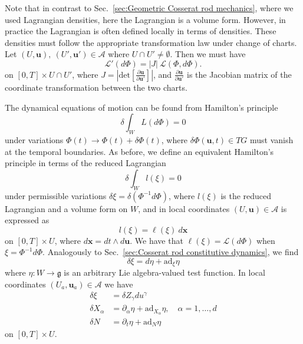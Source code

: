 Note that in contrast to Sec.~\ref{sec:Geometric Cosserat rod mechanics}, where we used Lagrangian densities, here the Lagrangian is a volume form. However, in practice the Lagrangian is often defined locally in terms of densities. These densities must follow the appropriate transformation law under change of charts. Let $(U, \mathbf{u}),\ (U', \mathbf{u}') \in \mathcal{A}$ where $U \cap U' \neq \emptyset$. Then we must have
\begin{equation} \label{eq:L transformation rule}
\mathcal{L}'(d \Phi) = |J|\ \mathcal{L}(\Phi, d \Phi).
\end{equation}
on $[0,T] \times U \cap U'$, where $J = \left| \text{det} \left[ \frac{\partial \mathbf{u} }{ \partial \mathbf{u}' } \right] \right|$, and $\frac{\partial \mathbf{u}}{ \partial \mathbf{u}' }$ is the Jacobian matrix of the coordinate transformation between the two charts.

The dynamical equations of motion can be found from Hamilton's principle
\begin{equation} \label{eq:Hamiltons principle in d dimensions}
\delta \int_W L(d \Phi) = 0
\end{equation}
under variations $\Phi(t) \to \Phi(t) + \delta \Phi (t)$, where $\delta \Phi (\mathbf{u}, t) \in TG$ must vanish at the temporal boundaries. As before, we define an equivalent Hamilton's principle in terms of the reduced Lagrangian
\begin{equation} \label{eq:reduced Hamiltons principle in d dimensions}
\delta \int_W l(\xi) = 0
\end{equation}
under permissible variations $\delta \xi = \delta(\Phi^{-1} d \Phi )$, where $l(\xi)$ is the reduced Lagrangian and a volume form on $W$, and in local coordinates $(U, \mathbf{u}) \in \mathcal{A}$ is expressed as
\begin{equation}
l(\xi) = \ell(\xi)\ d\mathbf{x}
\end{equation}
on $[0, T] \times U$, where $d \mathbf{x} = dt \wedge d \mathbf{u}$. We have that $\ell(\xi) = \mathcal{L}(d \Phi)$ when $\xi = \Phi^{-1} d \Phi$. Analogously to Sec.~\ref{sec:Cosserat rod constitutive dynamics}, we find
\begin{equation}
\delta \xi = d \eta + \text{ad}_\xi \eta
\end{equation}
where $\eta : W \to \mathfrak{g}$ is an arbitrary Lie algebra-valued test function. In local coordinates $(U_a, \mathbf{u}_a) \in \mathcal{A}$ we have
\begin{subequations} \label{eq:variation of xi}
\begin{align}
\delta \xi & =  \delta Z_\gamma du^\gamma  \\ 
\delta X_\alpha & = \partial_\alpha \eta + \text{ad}_{X_\alpha} \eta, \quad \alpha = 1, \dots, d \\
\delta N & = \partial_t \eta + \text{ad}_{N} \eta
\end{align}
\end{subequations}
on $[0,T] \times U$.

